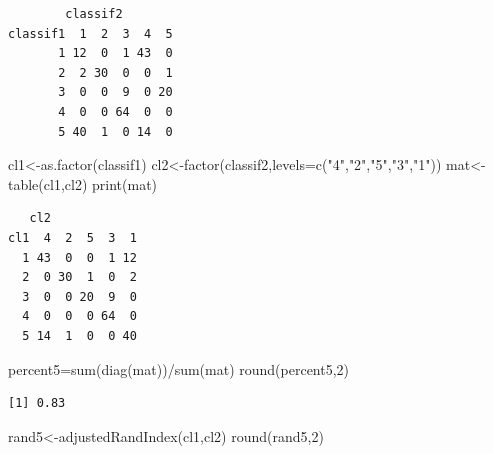 \documentclass[
  11pt,
]{article}
\newenvironment{Shaded}{\begin{snugshade}}{\end{snugshade}}
\newcommand{\AttributeTok}[1]{\textcolor[rgb]{0.77,0.63,0.00}{#1}}
\newcommand{\DecValTok}[1]{\textcolor[rgb]{0.00,0.00,0.81}{#1}}
\newcommand{\FunctionTok}[1]{\textcolor[rgb]{0.00,0.00,0.00}{#1}}
\newcommand{\NormalTok}[1]{#1}
\newcommand{\OtherTok}[1]{\textcolor[rgb]{0.56,0.35,0.01}{#1}}
\newcommand{\SpecialCharTok}[1]{\textcolor[rgb]{0.00,0.00,0.00}{#1}}
\newcommand{\StringTok}[1]{\textcolor[rgb]{0.31,0.60,0.02}{#1}}
\begin{document}
\begin{Shaded}
\end{Shaded}

\begin{verbatim}
        classif2
classif1  1  2  3  4  5
       1 12  0  1 43  0
       2  2 30  0  0  1
       3  0  0  9  0 20
       4  0  0 64  0  0
       5 40  1  0 14  0
\end{verbatim}

\begin{Shaded}
\begin{Highlighting}[]
\NormalTok{  cl1}\OtherTok{\textless{}{-}}\FunctionTok{as.factor}\NormalTok{(classif1)}
\NormalTok{  cl2}\OtherTok{\textless{}{-}}\FunctionTok{factor}\NormalTok{(classif2,}\AttributeTok{levels=}\FunctionTok{c}\NormalTok{(}\StringTok{"4"}\NormalTok{,}\StringTok{"2"}\NormalTok{,}\StringTok{"5"}\NormalTok{,}\StringTok{"3"}\NormalTok{,}\StringTok{"1"}\NormalTok{))}
\NormalTok{  mat}\OtherTok{\textless{}{-}}\FunctionTok{table}\NormalTok{(cl1,cl2)}
  \FunctionTok{print}\NormalTok{(mat)}
\end{Highlighting}
\end{Shaded}

\begin{verbatim}
   cl2
cl1  4  2  5  3  1
  1 43  0  0  1 12
  2  0 30  1  0  2
  3  0  0 20  9  0
  4  0  0  0 64  0
  5 14  1  0  0 40
\end{verbatim}

\begin{Shaded}
\begin{Highlighting}[]
\NormalTok{  percent5}\OtherTok{=}\FunctionTok{sum}\NormalTok{(}\FunctionTok{diag}\NormalTok{(mat))}\SpecialCharTok{/}\FunctionTok{sum}\NormalTok{(mat)}
  \FunctionTok{round}\NormalTok{(percent5,}\DecValTok{2}\NormalTok{)}
\end{Highlighting}
\end{Shaded}

\begin{verbatim}
[1] 0.83
\end{verbatim}

\begin{Shaded}
\begin{Highlighting}[]
\NormalTok{  rand5}\OtherTok{\textless{}{-}}\FunctionTok{adjustedRandIndex}\NormalTok{(cl1,cl2)}
  \FunctionTok{round}\NormalTok{(rand5,}\DecValTok{2}\NormalTok{)}
\end{Highlighting}
\end{Shaded}
\end{document}
